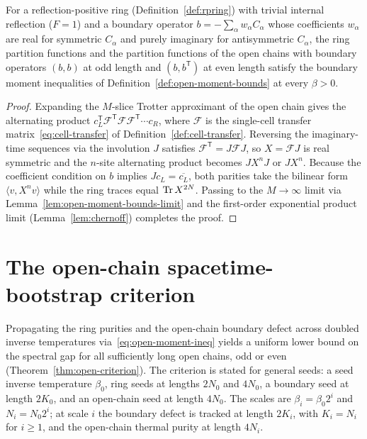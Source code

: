 \begin{theorem}
  \label{thm:open-moment-bounds}
  \leanok
  For a reflection-positive ring (Definition~\ref{def:rpring}) with trivial internal reflection
  (\(F = 1\)) and a boundary operator \(b = -\sum_\alpha w_\alpha C_\alpha\) whose coefficients
  \(w_\alpha\) are real for symmetric \(C_\alpha\) and purely imaginary for antisymmetric
  \(C_\alpha\), the ring partition functions and the partition functions of the open chains with
  boundary operators \((b, b)\) at odd length and \((b, b^{\mathsf T})\) at even length satisfy the
  boundary moment inequalities of Definition~\ref{def:open-moment-bounds} at every \(\beta > 0\).
\end{theorem}
\begin{proof}
  \leanok
  Expanding the \(M\)-slice Trotter approximant of the open chain gives the alternating product
  \(c_L^{\mathsf T} \mathcal F^{\mathsf T} \mathcal F \mathcal F^{\mathsf T} \cdots c_R\), where
  \(\mathcal F\) is the single-cell transfer matrix~\eqref{eq:cell-transfer} of
  Definition~\ref{def:cell-transfer}. Reversing the imaginary-time sequences via the involution
  \(J\) satisfies \(\mathcal F^{\mathsf T} = J \mathcal F J\), so \(X = \mathcal F J\) is real
  symmetric and the \(n\)-site alternating product becomes \(J X^n J\) or \(J X^n\). Because the
  coefficient condition on \(b\) implies \(J c_L = \overline{c_L}\), both parities take the
  bilinear form \(\langle v, X^n v\rangle\) while the ring traces equal \(\operatorname{Tr} X^{2N}\). Passing to
  the \(M \to \infty\) limit via Lemma~\ref{lem:open-moment-bounds-limit} and the first-order
  exponential product limit (Lemma~\ref{lem:chernoff}) completes the proof.
\end{proof}

\section{The open-chain spacetime-bootstrap criterion}

Propagating the ring purities and the open-chain boundary defect across doubled inverse
temperatures via~\eqref{eq:open-moment-ineq} yields a uniform lower bound on the spectral gap for
all sufficiently long open chains, odd or even (Theorem~\ref{thm:open-criterion}). The criterion
is stated for general seeds: a seed inverse temperature \(\beta_0\), ring seeds at lengths
\(2N_0\) and \(4N_0\), a boundary seed at length \(2K_0\), and an open-chain seed at length
\(4N_0\). The scales are \(\beta_i = \beta_0 2^i\) and \(N_i = N_0 2^i\); at scale \(i\) the
boundary defect is tracked at length \(2K_i\), with \(K_i = N_i\) for \(i \ge 1\), and the
open-chain thermal purity at length \(4N_i\).

